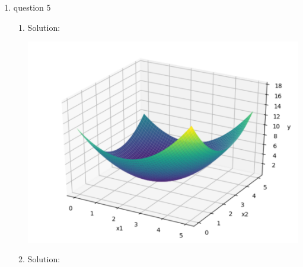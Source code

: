 \documentclass[12pt]{article}
\newcommand{\solu}{{\color{blue} Solution:}}
\begin{document}
\begin{enumerate}
\begin{enumerate}
            Therefore, $f(x) = -log(2x)$ is convex.

            \item $f(x) = e^{g(x)}$, where $g(x)$ is convex.
              
            \solu
            
            Since this function is $\mathbb{R} \Rightarrow \mathbb{R}$, we can calculate its second order derivative to determine whether it is convex.

            $f'(x) = e^{g(x)}g'(x)$\\
            $f''(x) = e^{g(x)}[g'(x)]^2 + e^{g(x)}g''(x)$\\
            Since $g(x)$ is convex, $g''(x) \ge 0$.\\
            And $e^{g(x)}[g'(x)]^2 \ge 0$, $e^{g(x)} \ge 0$.\\
            Then, $e^{g(x)}[g'(x)]^2 + e^{g(x)}g''(x) \ge 0$
            
            Therefore, $f(x) = e^{g(x)}$ is convex.
              
          \end{enumerate}

          \item question 5
          

          \begin{enumerate}
              \item \solu 
              
              \includegraphics[scale=0.6]{q5plotfunction.png}

              \item \solu
              

\end{enumerate}
\end{enumerate}
\end{document}
